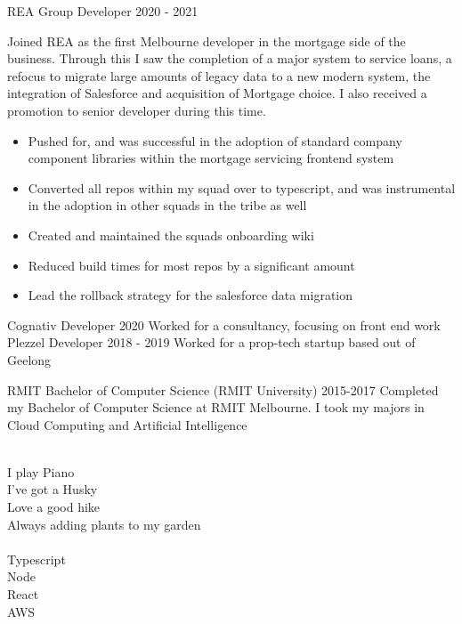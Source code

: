 \documentclass[8pt]{developercv}
\begin{document}
\begin{minipage}[t]{0.7\textwidth}
\begin{entrylist}
{\begin{itemize}
				\end{itemize}								
				}
			\entry
				{REA Group}
				{Developer}
				{2020 - 2021}
				{Joined REA as the first Melbourne developer in the mortgage side of the business. Through this I saw the completion of a major system to service loans, a refocus to migrate large amounts of legacy data to a new modern system, the integration of Salesforce and acquisition of Mortgage choice. I also received a promotion to senior developer during this time.
				\begin{itemize}
					\item Pushed for, and was successful in the adoption of standard company component libraries within the mortgage servicing frontend system
					\item Converted all repos within my squad over to typescript, and was instrumental in the adoption in other squads in the tribe as well
					\item Created and maintained the squads onboarding wiki
					\item Reduced  build times for most repos by a significant amount
					\item Lead the rollback strategy for the salesforce data migration
				\end{itemize}								
				}
			\entry
				{Cognativ}
				{Developer}
				{2020}
				{Worked for a consultancy, focusing on front end work}
			\entry
				{Plezzel}
				{Developer}
				{2018 - 2019}
				{Worked for a prop-tech startup based out of Geelong}
		\end{entrylist}			
		\begin{entrylist}	%
			\entry
				{RMIT}
				{Bachelor of Computer Science (RMIT University)}
				{2015-2017}
				{Completed my Bachelor of Computer Science at RMIT Melbourne. I took my majors in Cloud Computing and Artificial Intelligence }
		\end{entrylist}
	\end{minipage}
\begin{minipage}[t]{0.05\textwidth}
\hphantom{0.1}
\end{minipage}
	\begin{minipage}[t]{0.3\textwidth}		%
		
		\\
		{I play Piano}\\
		{I've got a Husky}\\
		{Love a good hike}\\
		{Always adding plants to my garden}\\
		
		\\
		{{Typescript}}\\
		{Node}\\
		{{React}}\\
		{AWS}\\

	\end{minipage}
\end{document}
